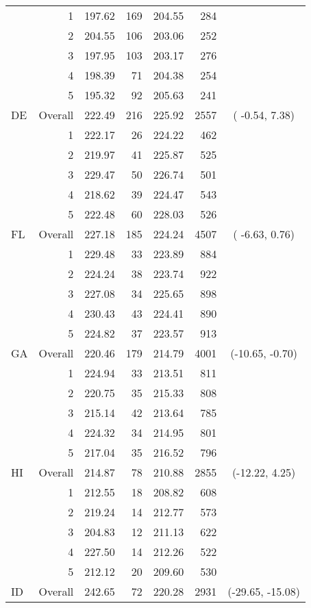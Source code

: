\begin{longtable}{lrrr@{\extracolsep{.25cm}}rrc}
   & 1 & 197.62 & 169 & 204.55 & 284 &  \\ 
   & 2 & 204.55 & 106 & 203.06 & 252 &  \\ 
   & 3 & 197.95 & 103 & 203.17 & 276 &  \\ 
   & 4 & 198.39 &  71 & 204.38 & 254 &  \\ 
   & 5 & 195.32 &  92 & 205.63 & 241 &  \\ 
   \hline
DE & Overall & 222.49 & 216 & 225.92 & 2557 & ( -0.54,   7.38) \\ 
   & 1 & 222.17 &  26 & 224.22 & 462 &  \\ 
   & 2 & 219.97 &  41 & 225.87 & 525 &  \\ 
   & 3 & 229.47 &  50 & 226.74 & 501 &  \\ 
   & 4 & 218.62 &  39 & 224.47 & 543 &  \\ 
   & 5 & 222.48 &  60 & 228.03 & 526 &  \\ 
   \hline
FL & Overall & 227.18 & 185 & 224.24 & 4507 & ( -6.63,   0.76) \\ 
   & 1 & 229.48 &  33 & 223.89 & 884 &  \\ 
   & 2 & 224.24 &  38 & 223.74 & 922 &  \\ 
   & 3 & 227.08 &  34 & 225.65 & 898 &  \\ 
   & 4 & 230.43 &  43 & 224.41 & 890 &  \\ 
   & 5 & 224.82 &  37 & 223.57 & 913 &  \\ 
   \hline
GA & Overall & 220.46 & 179 & 214.79 & 4001 & (-10.65,  -0.70) \\ 
   & 1 & 224.94 &  33 & 213.51 & 811 &  \\ 
   & 2 & 220.75 &  35 & 215.33 & 808 &  \\ 
   & 3 & 215.14 &  42 & 213.64 & 785 &  \\ 
   & 4 & 224.32 &  34 & 214.95 & 801 &  \\ 
   & 5 & 217.04 &  35 & 216.52 & 796 &  \\ 
   \hline
HI & Overall & 214.87 &  78 & 210.88 & 2855 & (-12.22,   4.25) \\ 
   & 1 & 212.55 &  18 & 208.82 & 608 &  \\ 
   & 2 & 219.24 &  14 & 212.77 & 573 &  \\ 
   & 3 & 204.83 &  12 & 211.13 & 622 &  \\ 
   & 4 & 227.50 &  14 & 212.26 & 522 &  \\ 
   & 5 & 212.12 &  20 & 209.60 & 530 &  \\ 
   \hline
ID & Overall & 242.65 &  72 & 220.28 & 2931 & (-29.65, -15.08) \\ 

\end{longtable}
